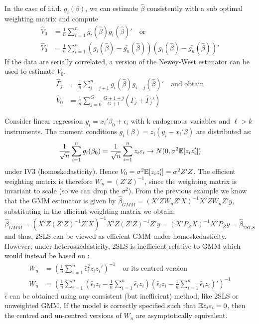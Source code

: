 \documentclass[DIV=14,titlepage=false]{scrreprt}
\begin{document}
In the case of i.i.d. $g_i(\beta)$, we can estimate $\hat\beta$ consistently with a sub optimal weighting matrix and compute
\begin{align*}
    \hat V_0 &= \frac{1}{n} \sum_{i=1}^{n}g_i(\hat\beta)g_i(\hat\beta)' \quad \text{or}\\
    \hat V_0 &= \frac{1}{n} \sum_{i=1}^{n}\left(g_i(\hat\beta)-\bar{g_n}(\hat\beta)\right)\left(g_i(\hat\beta)-\bar{g_n}(\hat\beta)\right)'
\end{align*}
If the data are serially correlated, a version of the Newey-West estimator can be used to estimate $V_0$.\\
\begin{align*}
    \hat \Gamma_j &= \frac{1}{n}\sum_{i=j+1}^{n}g_i(\hat\beta)g_{i-j}(\hat\beta)' \quad \text{and obtain}\\
    \hat V_0 &= \frac{1}{n}\sum_{j=0}^{G}\frac{G+1-j}{G+1}\left(\hat\Gamma_j+\hat\Gamma_j ' \right) 
\end{align*}
\begin{example}
    Consider linear regression $y_i = x_i'\beta_0+\epsilon_i$ with k endogenous variables and $\ell>k$ instruments. The moment conditions $g_i(\beta) = z_i(y_i-x_i'\beta)$ are distributed as:
    \[
        \frac{1}{\sqrt{n}}\sum_{i=1}^{n}g_i(\beta_0)= \frac{1}{\sqrt{n}}\sum_{i=1}^{n} z_i \varepsilon_i \to N(0,\sigma^2\mathbb{E}[z_iz_i'])
    \]
    under IV3 (homoskedasticity). Hence $V_0=\sigma^2\mathbb{E}[z_iz_i'] = \sigma^2Z'Z$. The efficient weighting matrix is therefore $W_n = (Z'Z)^{-1}$, since the weighting matrix is invariant to scale (so we can drop the $\sigma^2$).
    From the previous example we know that the GMM estimator is given by $\hat\beta_{GMM} = (X'ZW_nZ'X)^{-1}X'ZW_nZ'y$, substituting in the efficient weighting matrix we obtain: \[
        \hat\beta_{GMM} = (X'Z(Z'Z)^{-1}Z'X)^{-1}X'Z(Z'Z)^{-1}Z'y = (X'P_ZX)^{-1}X'P_Zy = \hat\beta_{2SLS}\]
    and thus, 2SLS can be viewed as efficient GMM under homoskedasticity.\\
    However, under heteroskedasticity, 2SLS is inefficient relative to GMM which would instead be based on :
    \begin{align*}
        W_n &= \left(\frac{1}{n}\sum_{i=1}^{n}\hat\epsilon_i^2z_iz_i'\right)^{-1}\quad \text{or its centred version}\\
        W_n &= \left(\frac{1}{n}\sum_{i=1}^{n}\left(\hat\epsilon_i z_i - \frac{1}{n}\sum_{i=1}^{n}\hat\epsilon_i z_i\right)\left(\hat\epsilon_i z_i - \frac{1}{n}\sum_{i=1}^{n}\hat\epsilon_i z_i\right)'\right)^{-1}
    \end{align*}
    $\hat \epsilon$ can be obtained using any consistent (but inefficient) method, like 2SLS or unweighted GMM. If the model is correctly specified such that $\mathbb{E} z_i\varepsilon_i=0$, then the centred and un-centred versions of $W_n$ are asymptotically equivalent.
\end{example}
\end{document}
